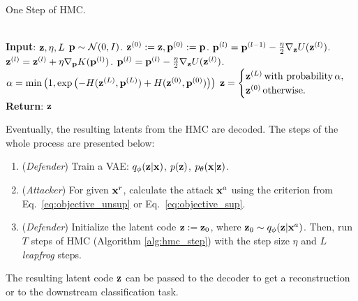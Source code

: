 \begin{algorithm}
	\caption{One Step of HMC.}
	\label{alg:hmc_step}
	\begin{algorithmic} %
 \\\hrulefill
	   \State \hskip-3mm \textbf{Input}: ${\mathbf{z}}, \eta, L$
		\State ${\mathbf{p}} \sim \mathcal{N}(0,I)$. 
		\State ${\mathbf{z}}^{(0)} := {\mathbf{z}}, {\mathbf{p}}^{(0)}:={\mathbf{p}}$.
		 
        \State $ {\mathbf{p}}^{(l)} = {\mathbf{p}}^{(l-1)} - \frac{\eta}{2}\nabla_{{\mathbf{z}}} U(\mathbf{z}^{(l)})$.
		\State ${\mathbf{z}}^{(l)} = {\mathbf{z}}^{(l)} + \eta  \nabla_{{\mathbf{p}}} K({\mathbf{p}}^{(l)})$.
		\State ${\mathbf{p}}^{(l)} = {\mathbf{p}}^{(l)} - \frac{\eta}{2}\nabla_{{\mathbf{z}}} U(\mathbf{z}^{(l)})$.
		\EndFor
		\State $\alpha = \min\left(1, \exp\left(- H({\mathbf{z}}^{(L)}, {\mathbf{p}}^{(L)}) + H({\mathbf{z}}^{(0)}, {\mathbf{p}}^{(0)})\right) \right)$
		\State ${\mathbf{z}} =
\begin{cases}
{\mathbf{z}}^{(L)}\, \text{with probability}\, \alpha ,\\
{\mathbf{z}}^{(0)}\, \text{otherwise}.
\end{cases}$  
        \State  \hskip-3mm \textbf{Return}: ${\mathbf{z}}$
	\end{algorithmic}
\end{algorithm}

Eventually, the resulting latents from the HMC are decoded. The steps of the whole process are presented below:
\begin{enumerate}%
    \item (\textit{Defender}) Train a VAE: $q_{\phi}({\mathbf{z}}|{\mathbf{x}})$, $p({\mathbf{z}})$, $p_{\theta}({\mathbf{x}}|{\mathbf{z}})$.
    \item (\textit{Attacker}) For given ${\mathbf{x}}^r$, calculate the attack ${\mathbf{x}}^{a}$ using the criterion from Eq.~\ref{eq:objective_unsup} or Eq.~\ref{eq:objective_sup}.
    \item (\textit{Defender}) Initialize the latent code ${\mathbf{z}} := {\mathbf{z}}_0$, where ${\mathbf{z}}_{0} \sim q_{\phi}({\mathbf{z}}|{\mathbf{x}}^{a})$. Then, run $T$ steps of HMC (Algorithm \ref{alg:hmc_step}) with the step size $\eta$ and $L$ \textit{leapfrog} steps.
\end{enumerate}

The resulting latent code ${\mathbf{z}}$ can be passed to the decoder to get a reconstruction or to the downstream classification task.
